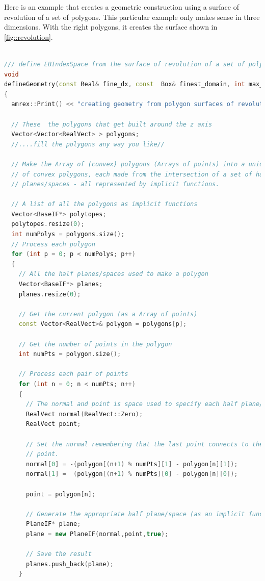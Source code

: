 Here is an example that creates a geometric construction using a
surface of revolution of a set of polygons.   This particular example
only makes sense in three dimensions.   With the right polygons, it
creates the surface shown in \ref{fig::revolution}.

\begin{lstlisting}[language=cpp]

/// define EBIndexSpace from the surface of revolution of a set of polygons
void
defineGeometry(const Real& fine_dx, const  Box& finest_domain, int max_grid_size)
{
  amrex::Print() << "creating geometry from polygon surfaces of revolution" << endl;

  // These  the polygons that get built around the z axis
  Vector<Vector<RealVect> > polygons;
  //....fill the polygons any way you like//

  // Make the Array of (convex) polygons (Arrays of points) into a union
  // of convex polygons, each made from the intersection of a set of half
  // planes/spaces - all represented by implicit functions.

  // A list of all the polygons as implicit functions
  Vector<BaseIF*> polytopes;
  polytopes.resize(0);
  int numPolys = polygons.size();
  // Process each polygon
  for (int p = 0; p < numPolys; p++)
  {
    // All the half planes/spaces used to make a polygon
    Vector<BaseIF*> planes;
    planes.resize(0);

    // Get the current polygon (as a Array of points)
    const Vector<RealVect>& polygon = polygons[p];

    // Get the number of points in the polygon
    int numPts = polygon.size();

    // Process each pair of points
    for (int n = 0; n < numPts; n++)
    {
      // The normal and point is space used to specify each half plane/space
      RealVect normal(RealVect::Zero);
      RealVect point;

      // Set the normal remembering that the last point connects to the first
      // point.
      normal[0] = -(polygon[(n+1) % numPts][1] - polygon[n][1]);
      normal[1] =  (polygon[(n+1) % numPts][0] - polygon[n][0]);

      point = polygon[n];

      // Generate the appropriate half plane/space (as an implicit function)
      PlaneIF* plane;
      plane = new PlaneIF(normal,point,true);

      // Save the result
      planes.push_back(plane);
    }


\end{lstlisting}
